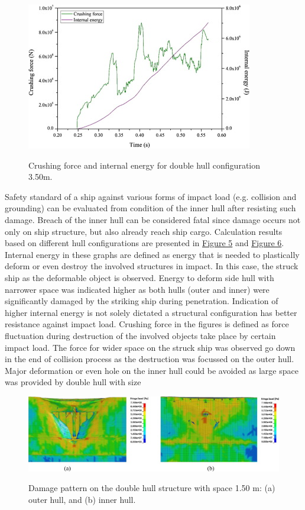 \documentclass[../Final.tex]{subfiles}
\begin{document}
\begin{figure}[ht]
    \centering
    \includegraphics[width=\columnwidth]{fig6.jpg}
    \label{fig6}
    \caption{Crushing force and internal energy for double hull configuration 3.50m.}
\end{figure}

Safety standard of a ship against various forms of impact load (e.g. collision and grounding) can be evaluated from condition of the inner hull after resisting such damage. 
Breach of the inner hull can be considered fatal since damage occurs not only on ship structure, but also already reach ship cargo. Calculation results based on different hull configurations are presented in \hyperref[fig5]{Figure 5} and \hyperref[fig6]{Figure 6}. 
Internal energy in these graphs are defined as energy that is needed to plastically deform or even destroy the involved structures in impact. 
In this case, the struck ship as the deformable object is observed. Energy to deform side hull with narrower space was indicated higher as both hulls (outer and inner) were significantly damaged by the striking ship during penetration. 
Indication of higher internal energy is not solely dictated a structural configuration has better resistance against impact load. 
Crushing force in the figures is defined as force fluctuation during destruction of the involved objects take place by certain impact load. 
The force for wider space on the struck ship was observed go down in the end of collision process as the destruction was focussed on the outer hull. Major deformation or even hole on the inner hull could be 
avoided as large space was provided by double hull with size

\begin{figure}[ht]
    \centering
    \includegraphics[width=\columnwidth]{fig7.jpg}
    \label{fig7}
    \caption{Damage pattern on the double hull structure with space 1.50 m: (a) outer hull, and (b) inner hull.}
\end{figure}
\end{document}
